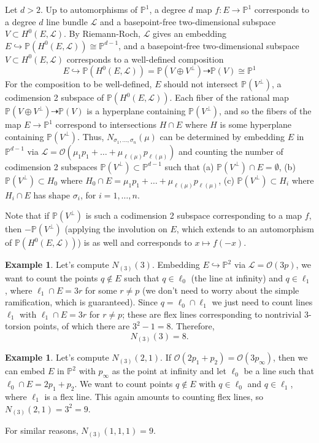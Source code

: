 \documentclass[thesis]{thesis-umich}           %
\renewcommand{\P}{\mathbb P}
\theoremstyle{definition}
\newtheorem{eg}[thm]{Example}
\begin{document}
Let $d>2$. Up to automorphisms of $\P^1$, a degree $d$ map $f:E\to\P^1$ corresponds to a degree $d$ line bundle $\mathcal L$ and a basepoint-free two-dimensional subspace $V\subset H^0(E,\mathcal L)$. By Riemann-Roch, $\mathcal L$ gives an embedding $E\hookrightarrow\P(H^0(E,\mathcal L))\cong\P^{d-1}$, and a basepoint-free two-dimensional subspace $V\subset H^0(E,\mathcal L)$ corresponds to a well-defined composition
\[
E\hookrightarrow \P(H^0(E,\mathcal L))=\P(V\oplus V^{\perp})\dashrightarrow\P(V)\cong\P^1
\]
For the composition to be well-defined, $E$ should not intersect $\P(V^{\perp})$, a codimension 2 subspace of $\P(H^0(E,\mathcal L))$. Each fiber of the rational map
$\P(V\oplus V^{\perp})\dashrightarrow\P(V)$ is a hyperplane containing $\P(V^{\perp})$, and so the fibers of the map $E\to\P^1$ correspond to intersections $H\cap E$ where $H$ is some hyperplane containing $\P(V^{\perp})$. Thus, $N_{\sigma_1,\dots,\sigma_n}(\mu)$ can be determined by embedding $E$ in $\P^{d-1}$ via $\mathcal L=\mathcal O(\mu_{1}p_1+\dots+\mu_{\ell(\mu)}p_{\ell(\mu)})$ and counting the number of codimension 2 subspaces $\P(V^{\perp})\subset \P^{d-1}$ such that (a) $\P(V^{\perp})\cap E=\emptyset$, (b) $\P(V^{\perp})\subset H_0$ where $H_0\cap E=\mu_{1}p_1+\dots+\mu_{\ell(\mu)}p_{\ell(\mu)}$, (c) $\P(V^{\perp})\subset H_i$ where $H_i\cap E$ has shape $\sigma_i$, for $i=1,\dots,n$.

Note that if $\P(V^{\perp})$ is such a codimension 2 subspace corresponding to a map $f$, then $-\P(V^{\perp})$ (applying the involution on $E$, which extends to an automorphism of $\P(H^0(E,\mathcal L))$) is as well and corresponds to $x\mapsto f(-x)$.

\begin{eg}
  Let's compute $N_{(3)}(3)$. Embedding $E\hookrightarrow\P^2$ via $\mathcal L=\mathcal O(3p)$, we want to count the points $q\notin E$ such that
  $q\in\ell_0$ (the line at infinity) and $q\in\ell_1$, where $\ell_1\cap E=3r$ for some $r\neq p$ (we don't need to worry about the simple ramification, which
  is guaranteed). Since $q=\ell_0\cap\ell_1$ we just need to count lines $\ell_1$ with $\ell_1\cap E=3r$ for $r\neq p$; these are flex lines corresponding to nontrivial 3-torsion points, of which there are $3^2-1=8$. Therefore,
  \[
  N_{(3)}(3)=8.
  \]
\end{eg}
\begin{eg}
  Let's compute $N_{(3)}(2,1)$. If $\mathcal O(2p_1+p_2)=\mathcal O(3p_{\infty})$, then we can embed $E$ in $\P^2$ with $p_{\infty}$ as the point at infinity
  and let $\ell_0$ be a line such that $\ell_0\cap E=2p_1+p_2$. We want to count points $q\notin E$ with $q\in \ell_0$ and $q\in \ell_1$, where $\ell_1$ is a flex line. This again amounts to counting flex lines, so $N_{(3)}(2,1)=3^2=9$.

  For similar reasons, $N_{(3)}(1,1,1)=9$.
\end{eg}
\end{document}
